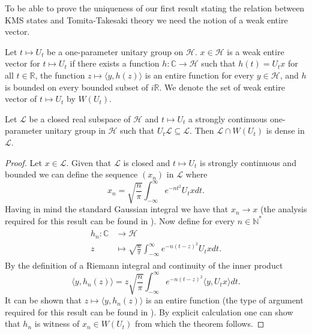 To be able to prove the uniqueness of our first result stating the relation between KMS states and Tomita-Takesaki theory we need the notion of a weak entire vector.

\begin{definition}
Let $t\mapsto U_t$ be a one-parameter unitary group on $\mathcal{H}$. $x\in\mathcal{H}$ is a weak entire vector for $t\mapsto U_t$ if there exists a function $h:\mathbb{C}\rightarrow\mathcal{H}$ such that $h(t)=U_tx$ for all $t\in\mathbb{R}$, the function $z\mapsto\langle y,h(z)\rangle$ is an entire function for every $y\in\mathcal{H}$, and $h$ is bounded on every bounded subset of $i\mathbb{R}$. We denote the set of weak entire vector of $t\mapsto U_t$ by $W(U_t)$.
\end{definition}

\begin{theorem}
Let $\mathcal{L}$ be a closed real subspace of $\mathcal{H}$ and $t\mapsto U_t$ a strongly continuous one-parameter unitary group in $\mathcal{H}$ such that $U_t\mathcal{L}\subseteq\mathcal{L}$. Then $\mathcal{L}\cap W(U_t)$ is dense in $\mathcal{L}$.
\end{theorem}

\begin{proof}
Let $x\in\mathcal{L}$. Given that $\mathcal{L}$ is closed and $t\mapsto U_t$ is strongly continuous and bounded we can define the sequence $(x_n)$ in $\mathcal{L}$ where
\begin{equation}
x_n=\sqrt{\frac{n}{\pi}}\int_{-\infty}^\infty e^{-nt^2}U_t xdt.
\end{equation} 
Having in mind the standard Gaussian integral we have that $x_n\rightarrow x$ (the analysis required for this result can be found in \cite{Duvenhage1999}). Now define for every $n\in\mathbb{N}^*$ 
\begin{align}
\begin{split}
h_n:\mathbb{C}&\rightarrow\mathcal{H} \\
z &\mapsto \sqrt{\frac{n}{\pi}}\int_{-\infty}^{\infty} e^{-n(t-z)^2}U_txdt.
\end{split}
\end{align}
By the definition of a Riemann integral and continuity of the inner product 
\begin{equation}
\langle y, h_n(z)\rangle = z \sqrt{\frac{n}{\pi}}\int_{-\infty}^{\infty} e^{-n(t-z)^2}\langle y, U_tx\rangle dt.
\end{equation}
It can be shown that $z\mapsto\langle y, h_n(z)\rangle$ is an entire function (the type of argument required for this result can be found in \cite{Duvenhage1999}). By explicit calculation one can show that $h_n$ is witness of $x_n\in W(U_t)$ from which the theorem follows.
\end{proof}

